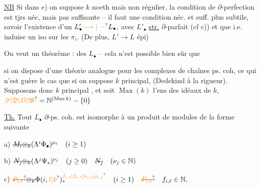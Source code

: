 \uline{NB} Si dans e) on suppose $k$ noeth mais non régulier, la condition  de $\partial$-perfection est tjrs néc, mais pas suffisante -- il faut une condition néc. et suff. plus subtile, savoir l'existence d'un $L'_\bullet\unsure{\longrightarrow|\mathrel{-}}L_\bullet$, avec $L'_\bullet$ \uline{str.} $\partial$-parfait (cf c)) et que   i.e. induise un iso sur les $\pi_i$. (De plus, \unsure{$\exists\exists$|$\exists$} $L'\to L$ épi)


On veut un théorème : \uline{} \uline{} des $L_\bullet$   -- cela n'est possible bien sûr que 

si on dispose d'une théorie analogue pour les complexes de chaînes  ps. coh, ce qui n'est guère le cas que si on suppose $k$ principal, (Dedekind à la rigueur). Supposons donc $k$  principal  
, et soit $\operatorname{Max}(k)$ l'ens des idéaux   de $k$, $\unsure{\mathscr D|\mathfrak D|D|\mathfrak B}=\mathbb N^{(\operatorname{Max} k)}-\{0\}$

\uline{Th.} Tout $L_\bullet$  $\partial$-ps. coh. est isomorphe à un produit de modules de la forme suivante

a) $\deleted{M_i\otimes_k}(\Lambda^i\Phi_\bullet)^{\mu_i}\quad(i\geq1)$  

b) $\deleted{N_j\otimes_k}(\Lambda^j\Psi_*)^{\nu_j}\quad(j\geq0)\quad\deleted{N_j}\quad(\nu_j\in\mathbb N)$

c) $\deleted{\unsure{P_{i,\ell}}\otimes_k}\Phi(i,\unsure{\ell|b})_*^{\unsure{f_{i,\ell}|\beta_{i,\ell}|h_{i,\ell}|\rho_{i,\ell}}}\quad(i\geq1)\quad\deleted{\unsure{P_{i,\ell}}}\quad f_{i,\ell}\in\mathbb N,$

